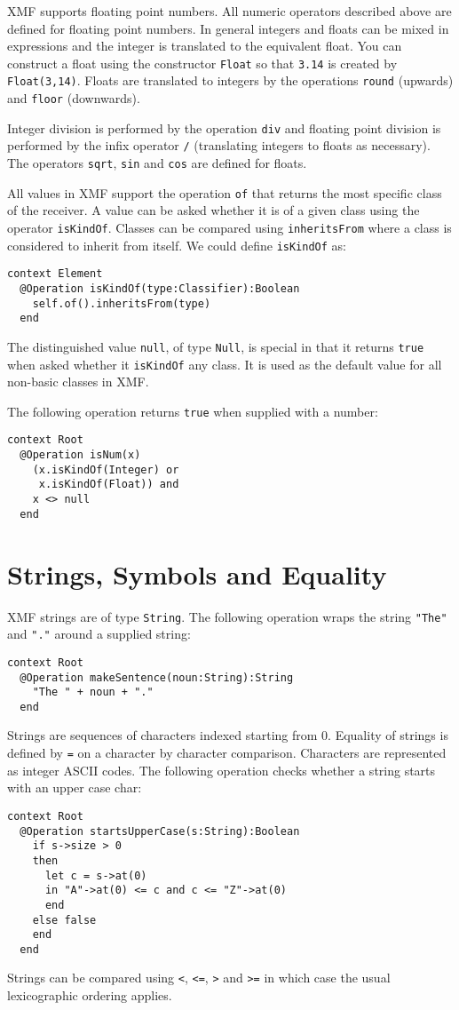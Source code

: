 \documentclass{article}
\begin{document}
XMF supports floating point numbers. All numeric operators described above are defined
for floating point numbers. In general integers and floats can be mixed in expressions
and the integer is translated to the equivalent float. You can construct a float using the
constructor {\tt Float} so that {\tt 3.14} is created by {\tt Float(3,14)}. Floats
are translated to integers by the operations {\tt round} (upwards) and {\tt floor} (downwards).

Integer division is performed by the operation {\tt div} and floating point division is
performed by the infix operator {\tt /} (translating integers to floats as necessary).
The operators {\tt sqrt}, {\tt sin} and {\tt cos} are defined for floats. 

All values in XMF support the operation {\tt of} that returns the most specific class of 
the receiver. A value can be asked whether it is of a given class using the operator {\tt isKindOf}.
Classes can be compared using {\tt inheritsFrom} where a class is considered to inherit 
from itself. We could define {\tt isKindOf} as:
\begin{verbatim}
context Element
  @Operation isKindOf(type:Classifier):Boolean
    self.of().inheritsFrom(type)
  end
\end{verbatim}
The distinguished value {\tt null}, of type {\tt Null}, is special in that it returns
{\tt true} when asked whether it {\tt isKindOf} any class. It is used as the default value
for all non-basic classes in XMF.

The following operation returns {\tt true} when supplied with a number:
\begin{verbatim}
context Root
  @Operation isNum(x)
    (x.isKindOf(Integer) or
     x.isKindOf(Float)) and
    x <> null
  end
\end{verbatim}

\section{Strings, Symbols and Equality}

XMF strings are of type {\tt String}. The following operation wraps the string {\tt "The"} and
{\tt "."} around a supplied string:
\begin{verbatim}
context Root
  @Operation makeSentence(noun:String):String
    "The " + noun + "."
  end
\end{verbatim}
Strings are sequences of characters indexed starting from 0. Equality of strings is
defined by {\tt =} on a character by character comparison. Characters are represented
as integer ASCII codes. The following operation checks whether a string starts with an
upper case char:
\begin{verbatim}
context Root
  @Operation startsUpperCase(s:String):Boolean
    if s->size > 0
    then
      let c = s->at(0)
      in "A"->at(0) <= c and c <= "Z"->at(0)
      end
    else false
    end
  end
\end{verbatim}
Strings can be compared using {\tt <}, {\tt <=}, {\tt >} and {\tt >=} in which case the usual
lexicographic ordering applies.
\end{document}
